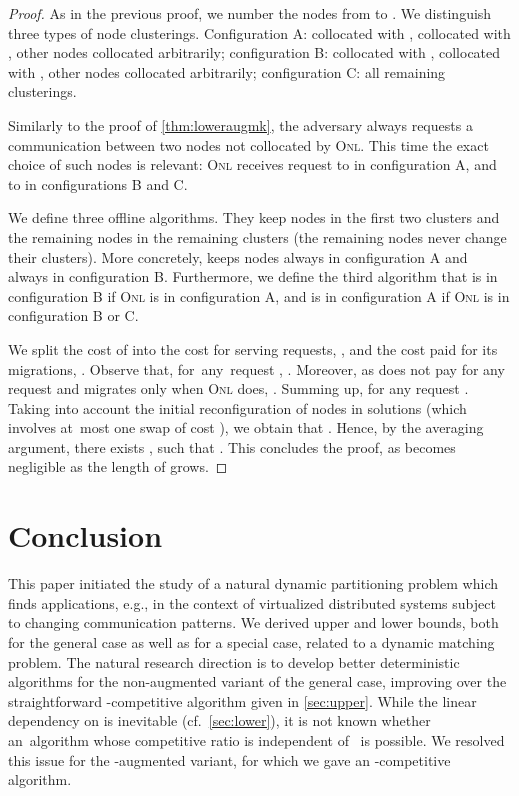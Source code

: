 \documentclass{siamart190516}
\newcommand{\ONL}{\textsc{Onl}\xspace}
\begin{document}
\begin{proof} As in the previous proof, we number the nodes from  to
. We distinguish three types of node clusterings. Configuration A:
 collocated with ,  collocated with , other nodes
collocated arbitrarily; configuration B:  collocated with , 
collocated with , other nodes collocated arbitrarily; configuration C:
all remaining clusterings.

Similarly to the proof of \cref{thm:loweraugmk}, the adversary always
requests a communication between two nodes not collocated by \ONL.
This time the exact choice of such nodes is relevant: \ONL receives request to
 in configuration A, and to  in configurations B and C.

We define three offline algorithms. They keep nodes
 in the first two clusters and the remaining nodes in the
remaining clusters (the remaining nodes never change their clusters). 
More concretely,  keeps nodes  always in
configuration A and  always in configuration B. Furthermore, we define
the third algorithm  that is in configuration B if \ONL is in
configuration A, and is in configuration A if \ONL is in configuration B or C.

We split the cost of  into the cost for serving requests, , and
the cost paid for its migrations, . Observe that, for~any~request
, .
Moreover, as  does not pay for any request and migrates only when 
\ONL does, . Summing up,
 for any request .
Taking into account the initial reconfiguration of nodes in  solutions
(which involves at~most one swap of cost ), we obtain that
. Hence, by the
averaging argument, there exists , such that . This concludes the proof, as  becomes
negligible as the length of  grows.
\end{proof}

\section{Conclusion}
\label{sec:conclusion}

This paper initiated the study of a natural dynamic partitioning problem which
finds applications, e.g., in the context of virtualized distributed systems
subject to changing communication patterns. We derived upper and lower bounds,
both for the general case as well as for a special case, related to a dynamic
matching problem. The natural research direction is to develop better
deterministic algorithms for the non-augmented variant of the general case,
improving over the straightforward -competitive algorithm
given in \cref{sec:upper}. While the linear dependency on  is
inevitable (cf.~\cref{sec:lower}), it is not known whether
an~algorithm whose competitive ratio is independent of~ is possible. We
resolved this issue for the -augmented variant, for which we gave an
-competitive algorithm.



\end{document}
